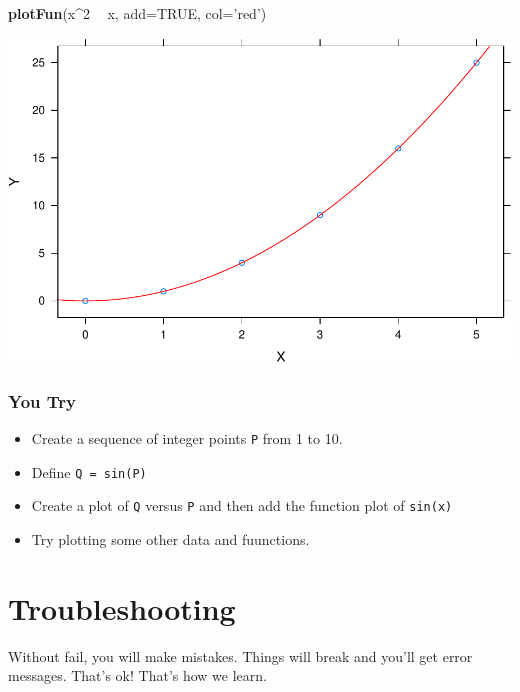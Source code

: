 \documentclass[
]{book}
\newenvironment{Shaded}{\begin{snugshade}}{\end{snugshade}}
\newcommand{\DataTypeTok}[1]{\textcolor[rgb]{0.13,0.29,0.53}{#1}}
\newcommand{\DecValTok}[1]{\textcolor[rgb]{0.00,0.00,0.81}{#1}}
\newcommand{\KeywordTok}[1]{\textcolor[rgb]{0.13,0.29,0.53}{\textbf{#1}}}
\newcommand{\NormalTok}[1]{#1}
\newcommand{\OperatorTok}[1]{\textcolor[rgb]{0.81,0.36,0.00}{\textbf{#1}}}
\newcommand{\OtherTok}[1]{\textcolor[rgb]{0.56,0.35,0.01}{#1}}
\newcommand{\StringTok}[1]{\textcolor[rgb]{0.31,0.60,0.02}{#1}}
\providecommand{\tightlist}{%
  \setlength{\itemsep}{0pt}\setlength{\parskip}{0pt}}
\begin{document}
\begin{Shaded}
\begin{Highlighting}[]
\KeywordTok{plotFun}\NormalTok{(x}\OperatorTok{^}\DecValTok{2} \OperatorTok{~}\StringTok{ }\NormalTok{x, }\DataTypeTok{add=}\OtherTok{TRUE}\NormalTok{, }\DataTypeTok{col=}\StringTok{'red'}\NormalTok{)}
\end{Highlighting}
\end{Shaded}

\includegraphics{_bookdown_files/math135_handbook_files/figure-latex/unnamed-chunk-67-2.pdf}

\hypertarget{you-try-3}{%
\subsubsection{You Try}\label{you-try-3}}

\begin{itemize}
\tightlist
\item
  Create a sequence of integer points \texttt{P} from 1 to 10.
\item
  Define \texttt{Q\ =\ sin(P)}
\item
  Create a plot of \texttt{Q} versus \texttt{P} and then add the function plot of \texttt{sin(x)}
\item
  Try plotting some other data and fuunctions.
\end{itemize}

\hypertarget{troubleshooting-1}{%
\section{Troubleshooting}\label{troubleshooting-1}}

Without fail, you will make mistakes. Things will break and you'll get error messages. That's ok! That's how
we learn.
\end{document}

